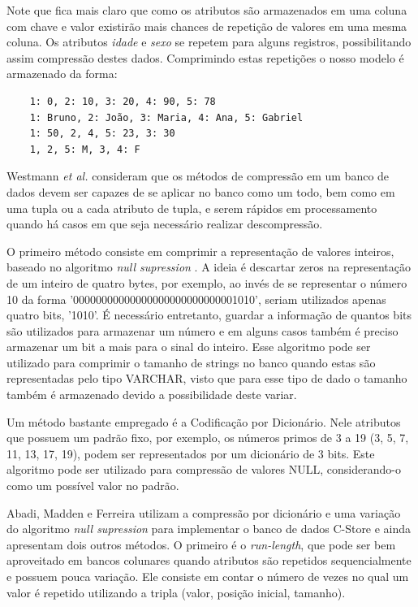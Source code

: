 Note que fica mais claro que como os atributos são armazenados em uma coluna com chave e valor 
existirão mais chances de repetição de valores em uma mesma coluna. Os atributos \textit{idade} e 
\textit{sexo} se repetem para alguns registros, possibilitando assim compressão destes dados. 
Comprimindo estas repetições o nosso modelo é armazenado da forma: 

\begin{verbatim}
    1: 0, 2: 10, 3: 20, 4: 90, 5: 78
    1: Bruno, 2: João, 3: Maria, 4: Ana, 5: Gabriel
    1: 50, 2, 4, 5: 23, 3: 30
    1, 2, 5: M, 3, 4: F
\end{verbatim}

Westmann \textit{et al.} \cite{westmann2000implementation} consideram que os métodos de compressão em um banco de dados devem ser capazes de se aplicar 
no banco como um todo, bem como em uma tupla ou a cada atributo de tupla, e serem rápidos em processamento quando há casos em que seja 
necessário realizar descompressão.

O primeiro método consiste em comprimir a representação de valores inteiros, baseado no algoritmo \textit{null supression} \cite{westmann2000implementation, roth1993database}. A ideia é descartar zeros na representação de um inteiro de quatro bytes, por exemplo, 
ao invés de se representar o número 10 da forma '00000000000000000000000000001010', seriam utilizados apenas quatro bits, '1010'. É 
necessário entretanto, guardar a informação de quantos bits são utilizados para armazenar um número e em alguns casos também é preciso 
armazenar um bit a mais para o sinal do inteiro. Esse algoritmo pode ser utilizado para comprimir o tamanho de strings no banco 
quando estas são representadas pelo tipo VARCHAR, visto que para esse tipo de dado o tamanho também é armazenado devido a possibilidade 
deste variar.

Um método bastante empregado é a Codificação por Dicionário. Nele atributos que possuem um padrão fixo, por exemplo, os números primos de 
3 a 19 (3, 5, 7, 11, 13, 17, 19), podem ser representados por um dicionário de 3 bits. Este algoritmo pode ser utilizado para compressão 
de valores NULL, considerando-o como um possível valor no padrão.

Abadi, Madden e Ferreira \cite{abadi2006integrating} utilizam a compressão por dicionário e uma variação do algoritmo \textit{null supression} para implementar o banco de dados C-Store e ainda apresentam dois outros métodos. O primeiro é o \textit{run-length}, que pode ser bem aproveitado 
em bancos colunares quando atributos são repetidos sequencialmente e possuem pouca variação. Ele consiste em contar o número de vezes no qual 
um valor é repetido utilizando a tripla (valor, posição inicial, tamanho). 




